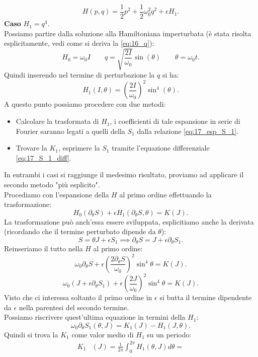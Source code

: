 \begin{exmp}
    \[
	H(p,q) = \frac{1}{2}p^2+\frac{1}{2}\omega_0^2q^2 + \epsilon H_1 
    .\] 
    \textbf{Caso }$H_1 = q^4$.\\
    Possiamo partire dalla soluzione alla Hamiltoniana imperturbata (è stata risolta esplicitamente, vedi come si deriva la \ref{eq:16_q}):
    \[
	H_0=\omega_0I \qquad q = \sqrt{\frac{2I}{\omega_0}} \sin (\theta  ) \qquad
        \theta =\omega_0t
    .\] 
    Quindi inserendo nel termine di perturbazione la $q$ si ha:
    \[
	H_1(I,\theta  ) = \left(\frac{2I}{\omega_0}\right)^{2}\sin^4(\theta) 
    .\] 
    A questo punto possiamo procedere con due metodi:
    \begin{itemize}
	\item Calcolare la trasformata di $H_1$, i coefficienti di tale espansione in serie di Fourier saranno legati a quelli della $S_1$ dalla relazione \ref{eq:17_esp_S_1}.
	\item Trovare la $K_1$, esprimere la $S_1$ tramite l'equazione differenziale \ref{eq:17_S_1_diff}.
    \end{itemize}
    In entrambi i casi si raggiunge il medesimo risultato, proviamo ad applicare il secondo metodo "più esplicito".\\
    Procediamo con l'espansione della $H$ al primo ordine effettuando la trasformazione:
    \[
	H_0(\partial_{\theta}S)+\epsilon H_1(\partial_{\theta}S,\theta) = K(J)
    .\] 
    La trasformazione può anch'essa essere sviluppata, esplicitiamo anche la derivata (ricordando che il termine perturbato dipende da $\theta$):
    \[
        S = \theta J + \epsilon S_1 \implies  \partial_{\theta}S = J + \epsilon\partial_{\theta}S_1
    .\] 
    Reinseriamo il tutto nella $H$ al primo ordine:
    \[
	\omega_0\partial_{\theta}S + \epsilon\left(\frac{2\partial_{\theta}S}{\omega_0}\right)^2\sin^4\theta =K(J)
    .\] 
    \[
	\omega_0(J + \epsilon\partial_{\theta}S_1)+ \epsilon\left(\frac{2J}{\omega_0}\right)^2\sin^4\theta =K(J)
    .\] 
    Visto che ci interessa soltanto il primo ordine in $\epsilon$ si butta il termine dipendente da $\epsilon$ nella parentesi del secondo termine.\\
    Possiamo riscrivere quest'ultima equazione in termini della $H_1$:
    \[
	\omega_0\partial_{\theta}S_1(\theta,J) = K_1(J)-H_1(J,\theta)
    .\]
    Quindi si trova la $K_1$ come valor medio di $H_1$ su un periodo:
    \[\begin{aligned}
	K_1&(J)= \frac{1}{2\pi} \int_{0}^{2\pi} H_1(\theta,J)d\theta =\\

\end{aligned}\]
\end{exmp}
